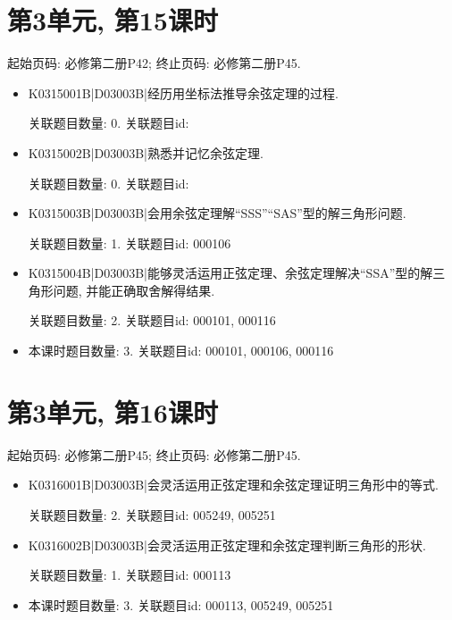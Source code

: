 \section*{第3单元, 第15课时}
起始页码: 必修第二册P42; 终止页码: 必修第二册P45.
\begin{itemize}
\item K0315001B|D03003B|经历用坐标法推导余弦定理的过程.

关联题目数量: 0. 关联题目id: 

\item K0315002B|D03003B|熟悉并记忆余弦定理.

关联题目数量: 0. 关联题目id: 

\item K0315003B|D03003B|会用余弦定理解``SSS''``SAS''型的解三角形问题.

关联题目数量: 1. 关联题目id: 000106

\item K0315004B|D03003B|能够灵活运用正弦定理、余弦定理解决``SSA''型的解三角形问题, 并能正确取舍解得结果.

关联题目数量: 2. 关联题目id: 000101, 000116

\item 本课时题目数量: 3. 关联题目id: 000101, 000106, 000116

\end{itemize}

\section*{第3单元, 第16课时}
起始页码: 必修第二册P45; 终止页码: 必修第二册P45.
\begin{itemize}
\item K0316001B|D03003B|会灵活运用正弦定理和余弦定理证明三角形中的等式.

关联题目数量: 2. 关联题目id: 005249, 005251

\item K0316002B|D03003B|会灵活运用正弦定理和余弦定理判断三角形的形状.

关联题目数量: 1. 关联题目id: 000113

\item 本课时题目数量: 3. 关联题目id: 000113, 005249, 005251

\end{itemize}


